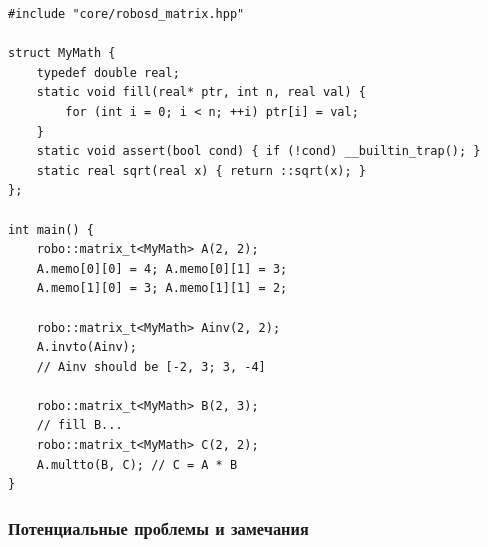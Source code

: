 \documentclass[a4paper,12pt]{article}
\begin{document}
\begin{lstlisting}[caption={Matrix operations example}]
#include "core/robosd_matrix.hpp"

struct MyMath {
    typedef double real;
    static void fill(real* ptr, int n, real val) {
        for (int i = 0; i < n; ++i) ptr[i] = val;
    }
    static void assert(bool cond) { if (!cond) __builtin_trap(); }
    static real sqrt(real x) { return ::sqrt(x); }
};

int main() {
    robo::matrix_t<MyMath> A(2, 2);
    A.memo[0][0] = 4; A.memo[0][1] = 3;
    A.memo[1][0] = 3; A.memo[1][1] = 2;

    robo::matrix_t<MyMath> Ainv(2, 2);
    A.invto(Ainv);
    // Ainv should be [-2, 3; 3, -4]

    robo::matrix_t<MyMath> B(2, 3);
    // fill B...
    robo::matrix_t<MyMath> C(2, 2);
    A.multto(B, C); // C = A * B
}
\end{lstlisting}

\subsubsection{Потенциальные проблемы и замечания}
\end{document}
